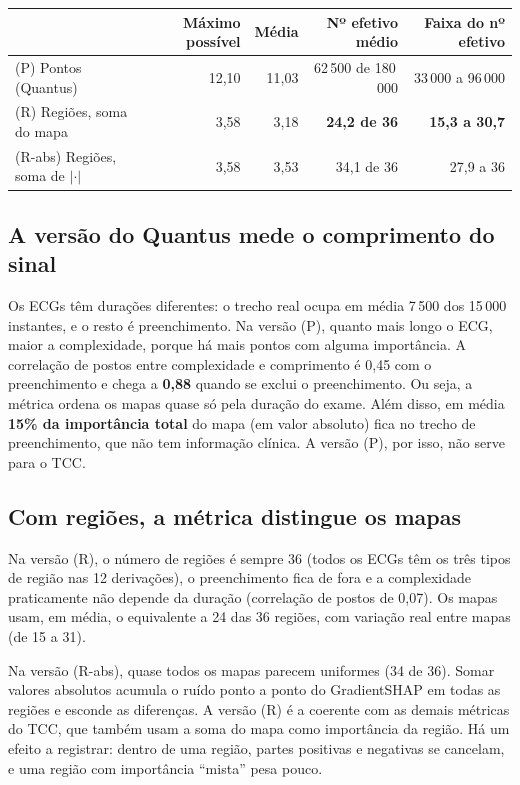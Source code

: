 \documentclass[11pt,a4paper]{article}
\begin{document}
\begin{center}\small
\begin{tabularx}{\linewidth}{Xrrrr}
\toprule
& \textbf{Máximo possível} & \textbf{Média} & \textbf{Nº efetivo médio} & \textbf{Faixa do nº efetivo} \\
\midrule
(P) Pontos (Quantus) & 12,10 & 11,03 & 62\,500 de 180\,000 & 33\,000 a 96\,000 \\
(R) Regiões, soma do mapa & 3,58 & 3,18 & \textbf{24,2 de 36} & \textbf{15,3 a 30,7} \\
(R-abs) Regiões, soma de $|\cdot|$ & 3,58 & 3,53 & 34,1 de 36 & 27,9 a 36 \\
\bottomrule
\end{tabularx}
\end{center}

\subsection{A versão do Quantus mede o comprimento do sinal}\label{sec:pontos}
Os ECGs têm durações diferentes: o trecho real ocupa em média 7\,500 dos 15\,000 instantes, e o resto é preenchimento. Na versão (P), quanto mais longo o ECG, maior a complexidade, porque há mais pontos com alguma importância. A correlação de postos entre complexidade e comprimento é 0,45 com o preenchimento e chega a \textbf{0,88} quando se exclui o preenchimento. Ou seja, a métrica ordena os mapas quase só pela duração do exame. Além disso, em média \textbf{15\% da importância total} do mapa (em valor absoluto) fica no trecho de preenchimento, que não tem informação clínica. A versão (P), por isso, não serve para o TCC.

\subsection{Com regiões, a métrica distingue os mapas}
Na versão (R), o número de regiões é sempre 36 (todos os ECGs têm os três tipos de região nas 12 derivações), o preenchimento fica de fora e a complexidade praticamente não depende da duração (correlação de postos de 0,07). Os mapas usam, em média, o equivalente a 24 das 36 regiões, com variação real entre mapas (de 15 a 31).

Na versão (R-abs), quase todos os mapas parecem uniformes (34 de 36). Somar valores absolutos acumula o ruído ponto a ponto do GradientSHAP em todas as regiões e esconde as diferenças. A versão (R) é a coerente com as demais métricas do TCC, que também usam a soma do mapa como importância da região. Há um efeito a registrar: dentro de uma região, partes positivas e negativas se cancelam, e uma região com importância “mista” pesa pouco.
\end{document}
